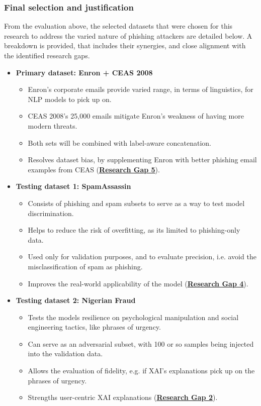 
\subsubsection*{Final selection and justification}
From the evaluation above, the selected datasets that were chosen for this research to address the varied nature of phishing attackers are detailed below. A breakdown is provided, that includes their synergies, and close alignment with the identified research gaps.

\begin{itemize}
  \item \textbf{Primary dataset: Enron + CEAS 2008}
  \begin{itemize}
    \item Enron's corporate emails provide varied range, in terms of linguistics, for NLP models to pick up on.
    \item CEAS 2008's 25,000 emails mitigate Enron's weakness of having more modern threats.
    \item Both sets will be combined with label-aware concatenation.
    \item Resolves dataset bias, by supplementing Enron with better phishing email examples from CEAS (\hyperref[research-gap-5]{\uline{\textbf{Research Gap 5}}}).
  \end{itemize}
  \item \textbf{Testing dataset 1: SpamAssassin}
  \begin{itemize}
    \item Consists of phishing and spam subsets to serve as a way to test model discrimination.
    \item Helps to reduce the risk of overfitting, as its limited to phishing-only data.
    \item Used only for validation purposes, and to evaluate precision, i.e. avoid the misclassification of spam as phishing.
    \item Improves the real-world applicability of the model (\hyperref[research-gap-4]{\uline{\textbf{Research Gap 4}}}).
  \end{itemize}
  \item \textbf{Testing dataset 2: Nigerian Fraud}
  \begin{itemize}
    \item Tests the models resilience on psychological manipulation and social engineering tactics, like phrases of urgency.
    \item Can serve as an adversarial subset, with 100 or so samples being injected into the validation data.
    \item Allows the evaluation of fidelity, e.g. if XAI's explanations pick up on the phrases of urgency.
    \item Strengths user-centric XAI explanations (\hyperref[research-gap-2]{\uline{\textbf{Research Gap 2}}}).
  \end{itemize}
\end{itemize}
